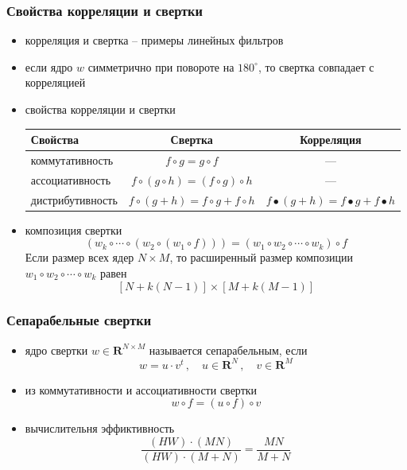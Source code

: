 \documentclass[12pt,t,usepdftitle=false,aspectratio=1610]{beamer}
\begin{document}
\begin{frame}
    \frametitle{Свойства корреляции и свертки}
    \begin{itemize}
        \item корреляция и свертка -- примеры линейных фильтров
        \item если ядро $w$ симметрично при повороте на $180^\circ$,
              то свертка совпадает с корреляцией
        \item свойства корреляции и свертки
        \begin{center}
        \begin{tabular}{ |l|c|c| } 
            \hline
            \textbf{Свойства} & \textbf{Свертка} & \textbf{Корреляция} \\
            \hline
            коммутативность  & $f\circ g=g\circ f$ & --- \\ 
            ассоциативность  & $f\circ (g\circ h) = (f\circ g)\circ h$ & --- \\ 
            дистрибутивность & $f\circ(g+h)=f\circ g + f\circ h$ & $f\bullet(g+h)=f\bullet g + f\bullet h$ \\ 
            \hline
        \end{tabular}
        \end{center}
        \item композиция свертки
        $$
            \left(w_k\circ\cdots\circ \left(w_2\circ (w_1\circ f)\right)\right) = 
            \left(w_1\circ w_2\circ\cdots\circ w_k\right)\circ f
        $$
        Если размер всех ядер $N\times M$, то расширенный размер композиции 
        $w_1\circ w_2\circ\cdots\circ w_k$ равен
        $$
            [N + k(N-1)]\times[M + k(M-1)]
        $$
    \end{itemize}
\end{frame}

\begin{frame}
\frametitle{Сепарабельные свертки}
\begin{itemize}
    \item ядро свертки $w\in\mathbf{R}^{N\times M}$ называется сепарабельным, если
    $$
        w = u \cdot v^t\,,\quad u\in\mathbf{R}^N\,,\quad v\in\mathbf{R}^M
    $$
    \item из коммутативности и ассоциативности свертки
    $$
        w\circ f = (u\circ f) \circ v
    $$ 
    \item вычислительня эффиктивность
    $$
        \frac{(HW)\cdot (MN)}{(HW)\cdot(M+N)}=\frac{MN}{M+N}
    $$
\end{itemize}
\end{frame}
\end{document}
